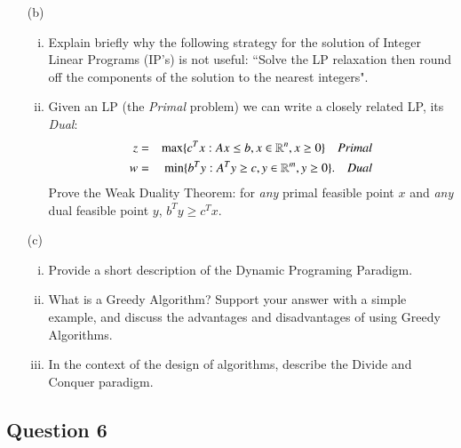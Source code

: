 \documentclass[12pt]{article}
\begin{document}
\begin{itemize}
			\item[(b)] 
			\begin{enumerate}[(i)]
				\item Explain briefly why the following strategy for the solution of Integer
				Linear Programs (IP’s) is not useful: ``Solve the LP relaxation
				then round off the components of the solution to the nearest integers". 
				\item Given an LP (the \emph{Primal} problem) we can write a closely related LP, its \emph{Dual}:
				\begin{eqnarray*}
					z &=& \max\{c^T x : Ax \le b,  x \in \mathbb{R}^n, x \ge 0 \}\quad \emph{Primal}\label{eq:lp-primal-1}\\
					w&=&    \min \{b^T  y : A^T y  \ge c,  y \in \mathbb{R}^m, y  \ge 0\}. \quad\emph{Dual}\label{eq:lp-dual-1}
				\end{eqnarray*}
				Prove the Weak Duality Theorem: for \emph{any} primal feasible
				point $x$ and \emph{any} dual feasible point $y$, $ b^T y \ge c^T x$.
			\end{enumerate}	

			\item[(c)]
			\begin{enumerate}[(i)]

				
							\item Provide a short description of the Dynamic Programing Paradigm.  
							\item What is a Greedy Algorithm? Support your answer with a simple example, and discuss the advantages and disadvantages of using Greedy Algorithms.   															
								\item In the context of the design of algorithms, describe the Divide and Conquer paradigm. 
			\end{enumerate}

		\end{itemize}
		
\newpage
				\subsection*{Question 6}
				
				
\end{document}
